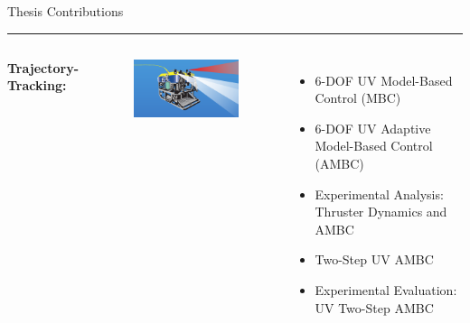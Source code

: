 \begin{frame}{Thesis Contributions}
{{\color{red}\rule{\linewidth}{4pt}
\vspace*{-2mm}
   \begin{columns}
{\bf Trajectory-Tracking:}
    \begin{center}
      \begin{figure}[htbp]
        \begin{center}
          \includegraphics[width=\textwidth]{./pres/images/justJason}
        \end{center}
      \end{figure}
    \end{center}
\vspace*{-2mm}
   \begin{itemize}
\item 6-DOF UV Model-Based Control (MBC)
\item 6-DOF UV Adaptive Model-Based Control (AMBC)
\item Experimental Analysis: Thruster Dynamics and AMBC
\item<1> Two-Step UV AMBC
\item<1-2> Experimental Evaluation: UV Two-Step AMBC
   \end{itemize}%
\vskip9pt
\end{columns}}}

\end{frame}

